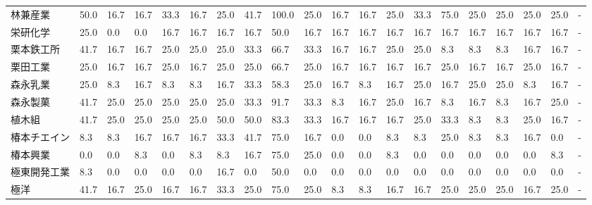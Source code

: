 \documentclass[a4paper，11pt]{jsarticle}
\begin{document}
\begin{longtable}[c]{lp{3mm}p{3mm}p{3mm}p{3mm}p{3mm}p{3mm}p{3mm}p{3mm}p{3mm}p{3mm}p{3mm}p{3mm}p{3mm}p{3mm}p{3mm}p{3mm}p{3mm}p{3mm}p{3mm}}
林兼産業            &   50.0 &   16.7 &      16.7 &      33.3 &       16.7 &   25.0 &   41.7 &  100.0 &    25.0 &    16.7 &   16.7 &  25.0 &   33.3 &    75.0 &    25.0 &  25.0 &  25.0 &  25.0 &     - \\
栄研化学            &   25.0 &    0.0 &       0.0 &      16.7 &       16.7 &   16.7 &   16.7 &   50.0 &    16.7 &    16.7 &   16.7 &  16.7 &   16.7 &    16.7 &    16.7 &  16.7 &  16.7 &  16.7 &     - \\
栗本鉄工所           &   41.7 &   16.7 &      16.7 &      25.0 &       25.0 &   25.0 &   33.3 &   66.7 &    33.3 &    16.7 &   16.7 &  25.0 &   25.0 &     8.3 &     8.3 &   8.3 &  16.7 &  16.7 &     - \\
栗田工業            &   25.0 &   16.7 &      16.7 &      25.0 &       16.7 &   25.0 &   25.0 &   66.7 &    25.0 &    16.7 &   16.7 &  16.7 &   16.7 &    25.0 &    16.7 &  16.7 &  25.0 &  16.7 &     - \\
森永乳業            &   25.0 &    8.3 &      16.7 &       8.3 &        8.3 &   16.7 &   33.3 &   58.3 &    25.0 &    16.7 &    8.3 &  16.7 &   25.0 &    16.7 &    25.0 &  25.0 &   8.3 &  16.7 &     - \\
森永製菓            &   41.7 &   25.0 &      25.0 &      25.0 &       25.0 &   25.0 &   33.3 &   91.7 &    33.3 &     8.3 &   16.7 &  25.0 &   16.7 &     8.3 &    16.7 &   8.3 &  16.7 &  25.0 &     - \\
植木組             &   41.7 &   25.0 &      25.0 &      25.0 &       25.0 &   50.0 &   50.0 &   83.3 &    33.3 &    16.7 &   16.7 &  16.7 &   25.0 &    33.3 &     8.3 &   8.3 &  25.0 &  16.7 &     - \\
椿本チエイン          &    8.3 &    8.3 &      16.7 &      16.7 &       16.7 &   33.3 &   41.7 &   75.0 &    16.7 &     0.0 &    0.0 &   8.3 &    8.3 &    25.0 &     8.3 &   8.3 &  16.7 &   0.0 &     - \\
椿本興業            &    0.0 &    0.0 &       8.3 &       0.0 &        8.3 &    8.3 &   16.7 &   75.0 &    25.0 &     0.0 &    0.0 &   8.3 &    0.0 &     0.0 &     0.0 &   0.0 &   0.0 &   8.3 &     - \\
極東開発工業          &    8.3 &    0.0 &       0.0 &       0.0 &        0.0 &   16.7 &    0.0 &   50.0 &     0.0 &     0.0 &    0.0 &   0.0 &    0.0 &     0.0 &     0.0 &   0.0 &   0.0 &   0.0 &     - \\
極洋              &   41.7 &   16.7 &      25.0 &      16.7 &       16.7 &   33.3 &   25.0 &   75.0 &    25.0 &     8.3 &    8.3 &  16.7 &   16.7 &    25.0 &    25.0 &  25.0 &  16.7 &  25.0 &     - \\

\end{longtable}
\end{document}
